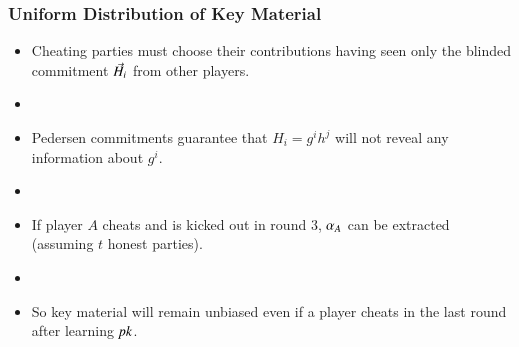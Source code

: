 \documentclass[hyperref={pdfpagelabels=true},table,dvipsnames,14pt,aspectratio=169]{beamer}
\begin{document}
\begin{frame}
  \centering
{}
\end{frame}


\begin{frame}
  \frametitle{Uniform Distribution of Key Material}

  \begin{itemize}
    \item Cheating parties must choose their contributions having seen only the blinded commitment $\vec{H}_i$ from other players.
    \item[]
    \item<2-> Pedersen commitments guarantee that $H_i = g^ih^j$ will not reveal any information about $g^i$.
    \item[]
    \item<3-> If player $A$ cheats and is kicked out in round $3$,  $\alpha_A$ can be extracted (assuming $t$ honest parties).
    \item[]
    \item<4-> So key material will remain unbiased even if a player cheats in the last round after learning $\mathit{pk}$.
  \end{itemize}
\end{frame}
\end{document}
